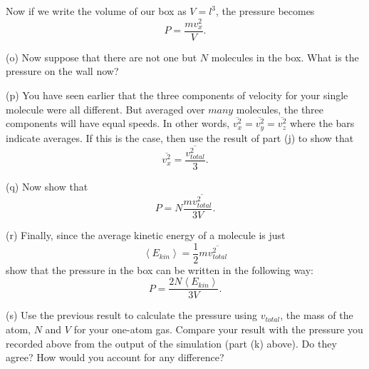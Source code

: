 \pagebreak[2]
Now if we write the volume of our box as $V=l^{3}$, the pressure becomes
\[
P=\frac{mv_{x}^{2}}{V}.\]

(o) Now suppose that there are not one but $N$ molecules in the box. What
is the pressure on the wall now?
\answerspace{20mm}

(p) You have seen earlier that the three components of velocity for your single molecule were all different.  But averaged over $many$ molecules, the three components will have equal speeds.  In other words,  $\overline{v_{x}^{2}}=\overline{v_{y}^{2}}=\overline{v_{z}^{2}}$ where the bars indicate averages. If this is the case, then use the result of part (j) to show that
\[
\overline{v_{x}^{2}}=\frac{\overline{v_{total}^{2}}}{3}.\]


(q) Now show that 
\[
P=N\frac{m\overline{v_{total}^{2}}}{3V}.\]

\answerspace{20mm}

(r) Finally, since the average kinetic energy of a molecule is just
\[
\left<E_{kin}\right>=\frac{1}{2}m\overline{v_{total}^{2}}\]
show that the pressure in the box can be written in the following
way:
\[
P=\frac{2N\left<E_{kin}\right>}{3V}.\]
\answerspace{20mm}

(s) Use the previous result to calculate the pressure using $v_{total}$, the mass of the atom, $N$ and $V$ for your one-atom gas. Compare your result with the pressure you recorded above from the output of the simulation (part (k) above).
Do they agree? How would you account for any difference?
\answerspace{20mm}
